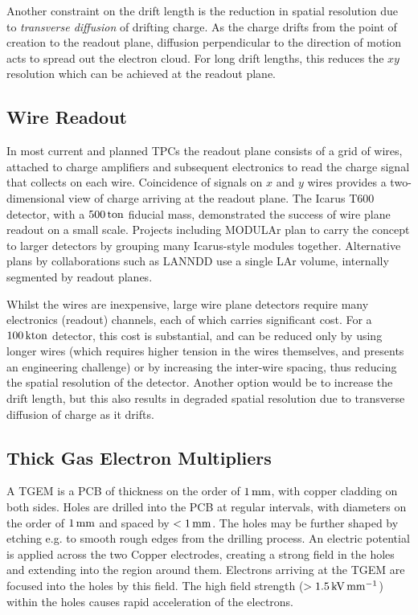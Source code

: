 Another constraint on the drift length is the reduction in spatial resolution due to \emph{transverse diffusion} of drifting charge. As the charge drifts from the point of creation to the readout plane, diffusion perpendicular to the direction of motion acts to spread out the electron cloud. For long drift lengths, this reduces the $xy$ resolution which can be achieved at the readout plane.

\subsection{Wire Readout}
In most current and planned \acsp{TPC} the readout plane consists of a grid of wires, attached to charge amplifiers and subsequent electronics to read the charge signal that collects on each wire. Coincidence of signals on $x$ and $y$ wires provides a two-dimensional view of charge arriving at the readout plane. The {\sc Icarus} T600\citep{Amerio2004} detector, with a $500\,\mathrm{ton}$ fiducial mass, demonstrated the success of wire plane readout on a small scale. Projects including MODULAr\citep{Baibussinov2008} plan to carry the concept to larger detectors by grouping many {\sc Icarus}-style modules together. Alternative plans by collaborations such as LANNDD\citep{Cline2003} use a single \ac{LAr} volume, internally segmented by readout planes.

Whilst the wires are inexpensive, large wire plane detectors require many electronics (readout) channels, each of which carries significant cost. For a $100\,\mathrm{kton}$ detector, this cost is substantial, and can be reduced only by using longer wires (which requires higher tension in the wires themselves, and presents an engineering challenge) or by increasing the inter-wire spacing, thus reducing the spatial resolution of the detector. Another option would be to increase the drift length, but this also results in degraded spatial resolution due to transverse diffusion of charge as it drifts.

\subsection{Thick Gas Electron Multipliers}
A \ac{TGEM} is a \ac{PCB} of thickness on the order of $1\,\mathrm{mm}$, with copper cladding on both sides. Holes are drilled into the \ac{PCB} at regular intervals, with diameters on the order of $1\,\mathrm{mm}$ and spaced by $< 1\,\mathrm{mm}$. The holes may be further shaped by etching e.g. to smooth rough edges from the drilling process. An electric potential is applied across the two Copper electrodes, creating a strong field in the holes and extending into the region around them. Electrons arriving at the \ac{TGEM} are focused into the holes by this field. The high field strength ($> 1.5 \,\mathrm{kV} \,\mathrm{mm}^{-1}$) within the holes causes rapid acceleration of the electrons.

